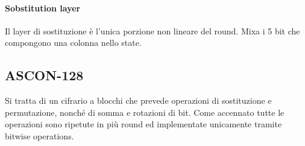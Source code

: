 \paragraph*{Sobstitution layer}
Il layer di sostituzione è l'unica porzione non lineare del round. Mixa i 5 bit che compongono una colonna nello state.

\subsection{ASCON-128}
Si tratta di un cifrario a blocchi che prevede operazioni di sostituzione e permutazione, nonché di somma e rotazioni di bit. Come accennato tutte le operazioni sono ripetute in più round ed implementate unicamente tramite bitwise operations.

\newpage